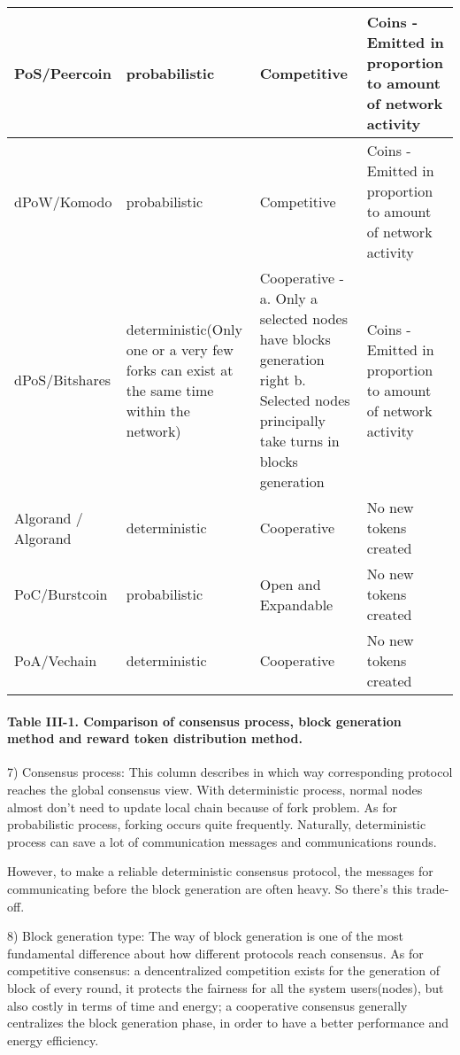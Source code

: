 \documentclass[doublespacing]{bmcart}
\begin{document}
\begin{CJK*}{UTF8}{gbsn}
\begin{tabular}{p{2cm}p{3cm}p{3cm}p{3cm}}
PoS/Peercoin 
& probabilistic
& Competitive 
& Coins - Emitted in proportion to amount of network activity \\ \hline

dPoW/Komo\-do  
& probabilistic
& Competitive 
&  Coins - Emitted in proportion to amount of network activity\\ \hline

dPoS/\newline Bitshares  
& deterministic(Only one or a very few forks can exist at the same time within the network)
& Cooperative -\newline a. Only a selected nodes have blocks generation right \newline b. Selected nodes principally take turns in blocks generation 
& Coins - Emitted in proportion to amount of network activity \\ \hline

Algorand / Algorand
& deterministic 
& Cooperative 
& No new tokens created \\ \hline

PoC/Burst\-coin & probabilistic & Open and Expandable & No new tokens created \\ \hline
PoA/Vechain & deterministic & Cooperative & No new tokens created \\ \hline
\end{tabular}
\paragraph{Table III-1. Comparison of consensus process, block generation method and reward token distribution method.}
	 
7) Consensus process: This column describes in which way corresponding protocol reaches the global consensus view. With deterministic process, normal nodes almost don't need to update local chain because of fork problem. As for probabilistic process, forking occurs quite frequently. Naturally, deterministic process can save a lot of communication messages and communications rounds.
 
 However, to make a reliable deterministic consensus protocol, the messages for communicating before the block generation are often heavy. So there's this trade-off.
	 
8) Block generation type: The way of block generation is one of the most fundamental difference about how different protocols reach consensus. As for competitive consensus: a dencentralized competition exists for the generation of block of every round, it protects the fairness for all the system users(nodes), but also costly in terms of time and energy; a cooperative consensus generally centralizes the block generation phase, in order to have a better performance and energy efficiency.



\end{CJK*}
\end{document}
